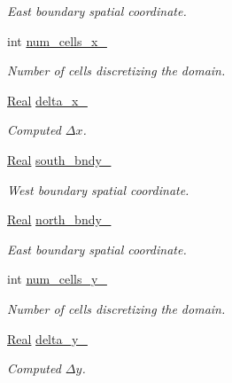 \begin{DoxyCompactItemize}
\begin{DoxyCompactList}\small\item\em East boundary spatial coordinate. \end{DoxyCompactList}\item 
int \hyperlink{classmtk_1_1UniStgGrid2D_ac03a0f4840ee6ae1bc853e5d9c0df8d1}{num\+\_\+cells\+\_\+x\+\_\+}
\begin{DoxyCompactList}\small\item\em Number of cells discretizing the domain. \end{DoxyCompactList}\item 
\hyperlink{group__c01-roots_gac080bbbf5cbb5502c9f00405f894857d}{Real} \hyperlink{classmtk_1_1UniStgGrid2D_ab1fbb3cf685c51f434488e378564bd2a}{delta\+\_\+x\+\_\+}
\begin{DoxyCompactList}\small\item\em Computed $ \Delta x $. \end{DoxyCompactList}\item 
\hyperlink{group__c01-roots_gac080bbbf5cbb5502c9f00405f894857d}{Real} \hyperlink{classmtk_1_1UniStgGrid2D_ac228c81fad7f4feeae93fb3c09d7e175}{south\+\_\+bndy\+\_\+}
\begin{DoxyCompactList}\small\item\em West boundary spatial coordinate. \end{DoxyCompactList}\item 
\hyperlink{group__c01-roots_gac080bbbf5cbb5502c9f00405f894857d}{Real} \hyperlink{classmtk_1_1UniStgGrid2D_a3f904091b6e74aa78d8543e5cba26afb}{north\+\_\+bndy\+\_\+}
\begin{DoxyCompactList}\small\item\em East boundary spatial coordinate. \end{DoxyCompactList}\item 
int \hyperlink{classmtk_1_1UniStgGrid2D_a3e4f61d781212ad57c34e9446c4074b6}{num\+\_\+cells\+\_\+y\+\_\+}
\begin{DoxyCompactList}\small\item\em Number of cells discretizing the domain. \end{DoxyCompactList}\item 
\hyperlink{group__c01-roots_gac080bbbf5cbb5502c9f00405f894857d}{Real} \hyperlink{classmtk_1_1UniStgGrid2D_ace5af3c991f241a895318b9761db73eb}{delta\+\_\+y\+\_\+}
\begin{DoxyCompactList}\small\item\em Computed $ \Delta y $. \end{DoxyCompactList}\end{DoxyCompactItemize}
